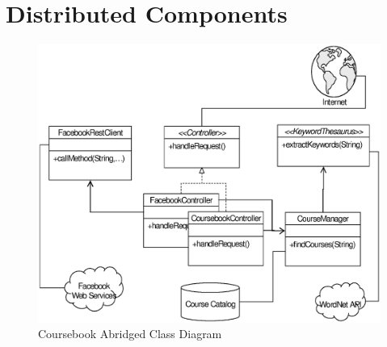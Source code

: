 \section{Distributed Components}
\begin{figure}[t]
  \begin{center}
  \includegraphics[width=\textwidth]{images/classes}
  \caption{Coursebook Abridged Class Diagram}
  \label{fig:classes}
  \end{center}
\end{figure}

